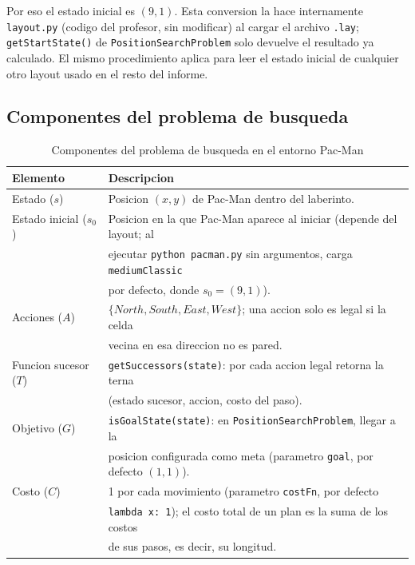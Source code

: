 Por eso el estado inicial es $(9,1)$. Esta conversion la hace internamente \texttt{layout.py}
(codigo del profesor, sin modificar) al cargar el archivo \texttt{.lay}; \texttt{getStartState()}
de \texttt{PositionSearchProblem} solo devuelve el resultado ya calculado. El mismo procedimiento
aplica para leer el estado inicial de cualquier otro layout usado en el resto del informe.

\subsection{Componentes del problema de busqueda}

\begin{table}[H]
\centering
\caption{Componentes del problema de busqueda en el entorno Pac-Man}
\label{tab:act1-componentes}
\begin{tabular}{ll}
\toprule
\textbf{Elemento} & \textbf{Descripcion} \\
\midrule
Estado ($s$) & Posicion $(x, y)$ de Pac-Man dentro del laberinto. \\
Estado inicial ($s_0$) & Posicion en la que Pac-Man aparece al iniciar (depende del layout; al \\
 & ejecutar \texttt{python pacman.py} sin argumentos, carga \texttt{mediumClassic} \\
 & por defecto, donde $s_0=(9,1)$). \\
Acciones ($A$) & $\{North, South, East, West\}$; una accion solo es legal si la celda \\
 & vecina en esa direccion no es pared. \\
Funcion sucesor ($T$) & \texttt{getSuccessors(state)}: por cada accion legal retorna la terna \\
 & (estado sucesor, accion, costo del paso). \\
Objetivo ($G$) & \texttt{isGoalState(state)}: en \texttt{PositionSearchProblem}, llegar a la \\
 & posicion configurada como meta (parametro \texttt{goal}, por defecto $(1,1)$). \\
Costo ($C$) & 1 por cada movimiento (parametro \texttt{costFn}, por defecto \\
 & \texttt{lambda x: 1}); el costo total de un plan es la suma de los costos \\
 & de sus pasos, es decir, su longitud. \\
\bottomrule
\end{tabular}
\end{table}

